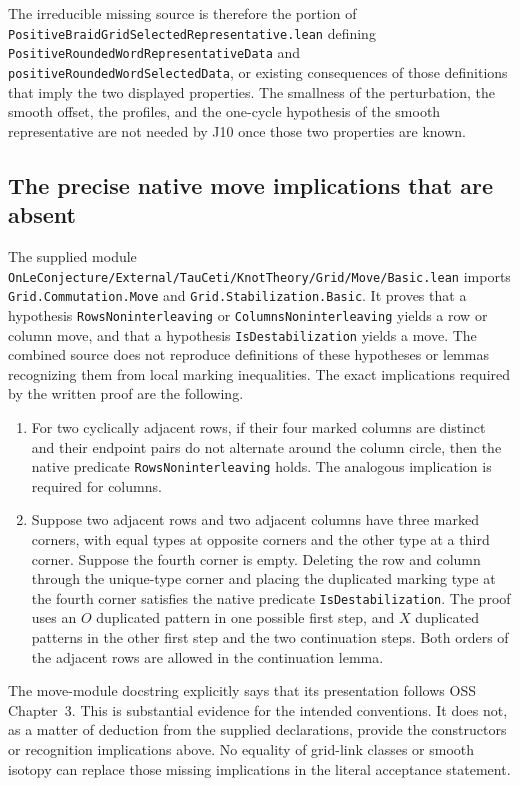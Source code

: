 \documentclass[11pt,oneside]{report}
\theoremstyle{definition}
\numberwithin{equation}{section}
\newcommand{\decl}[1]{\textnormal{\nolinkurl{#1}}}
\begin{document}
The irreducible missing source is therefore the portion of
\decl{PositiveBraidGridSelectedRepresentative.lean} defining
\decl{PositiveRoundedWordRepresentativeData} and
\decl{positiveRoundedWordSelectedData}, or existing consequences
of those definitions that imply the two displayed properties.
The smallness of the perturbation, the smooth offset, the profiles,
and the one-cycle hypothesis of the smooth representative are not
needed by J10 once those two properties are known.

\subsection{The precise native move implications that are absent}

The supplied module
\decl{OnLeConjecture/External/TauCeti/KnotTheory/Grid/Move/Basic.lean}
imports
\decl{Grid.Commutation.Move} and
\decl{Grid.Stabilization.Basic}.
It proves that a hypothesis
\decl{RowsNoninterleaving} or
\decl{ColumnsNoninterleaving} yields a row or column move, and
that a hypothesis \decl{IsDestabilization} yields a move.
The combined source does not reproduce definitions of these hypotheses
or lemmas recognizing them from local marking inequalities.
The exact implications required by the written proof are the following.

\begin{enumerate}
\item For two cyclically adjacent rows, if their four marked columns
are distinct and their endpoint pairs do not alternate around the
column circle, then the native predicate
\decl{RowsNoninterleaving} holds. The analogous implication is
required for columns.

\item Suppose two adjacent rows and two adjacent columns have three
marked corners, with equal types at opposite corners and the other
type at a third corner. Suppose the fourth corner is empty.
Deleting the row and column through the unique-type corner and placing
the duplicated marking type at the fourth corner satisfies the native
predicate \decl{IsDestabilization}.
The proof uses an $O$ duplicated pattern in one possible first step,
and $X$ duplicated patterns in the other first step and the two
continuation steps. Both orders of the adjacent rows are allowed in
the continuation lemma.
\end{enumerate}

The move-module docstring explicitly says that its presentation follows
OSS Chapter~3. This is substantial evidence for the intended conventions.
It does not, as a matter of deduction from the supplied declarations,
provide the constructors or recognition implications above.
No equality of grid-link classes or smooth isotopy can replace those
missing implications in the literal acceptance statement.
\end{document}
